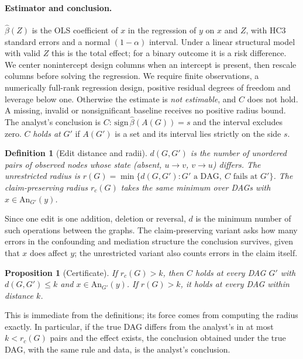 \documentclass[11pt]{article}
\newtheorem{definition}{Definition}
\newtheorem{proposition}{Proposition}
\begin{document}
\paragraph{Estimator and conclusion.} $\hat\beta(Z)$ is the OLS coefficient of $x$ in the regression of $y$ on $x$ and $Z$, with HC3 standard errors and a normal $(1-\alpha)$ interval. Under a linear structural model with valid $Z$ this is the total effect; for a binary outcome it is a risk difference. We center nonintercept design columns when an intercept is present, then rescale columns before solving the regression. We require finite observations, a numerically full-rank regression design, positive residual degrees of freedom and leverage below one. Otherwise the estimate is \emph{not estimable}, and $C$ does not hold. A missing, invalid or nonsignificant baseline receives no positive radius bound. The analyst's conclusion is $C$: $\mathrm{sign}\,\hat\beta(A(G))=s$ and the interval excludes zero. $C$ \emph{holds at} $G'$ if $A(G')$ is a set and its interval lies strictly on the side $s$.

\begin{definition}[Edit distance and radii]
$d(G,G')$ is the number of unordered pairs of observed nodes whose state (absent, $u\to v$, $v\to u$) differs. The \emph{unrestricted radius} is $r(G)=\min\{d(G,G') : G' \text{ a DAG},\ C \text{ fails at } G'\}$. The \emph{claim-preserving radius} $r_c(G)$ takes the same minimum over DAGs with $x\in\mathrm{An}_{G'}(y)$.
\end{definition}

Since one edit is one addition, deletion or reversal, $d$ is the minimum number of such operations between the graphs. The claim-preserving variant asks how many errors in the confounding and mediation structure the conclusion survives, given that $x$ does affect $y$; the unrestricted variant also counts errors in the claim itself.

\begin{proposition}[Certificate]
If $r_c(G)>k$, then $C$ holds at every DAG $G'$ with $d(G,G')\le k$ and $x\in\mathrm{An}_{G'}(y)$. If $r(G)>k$, it holds at every DAG within distance $k$.
\end{proposition}
This is immediate from the definitions; its force comes from computing the radius exactly. In particular, if the true DAG differs from the analyst's in at most $k<r_c(G)$ pairs and the effect exists, the conclusion obtained under the true DAG, with the same rule and data, is the analyst's conclusion.
\end{document}
